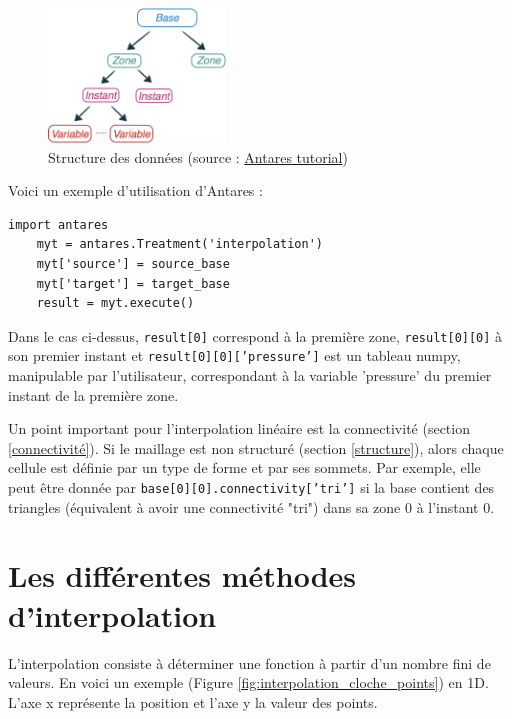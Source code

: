 \begin{figure}[H]
\centering
\includegraphics[width=0.42\textwidth]{images/data_structure_1.png}
\caption{Structure des données (source : \href{https://cerfacs.fr/antares/src/tutorial/base.html}{Antares tutorial})}
\label{fig:structure_antares}
\end{figure}

Voici un exemple d'utilisation d'Antares :

\begin{lstlisting}[caption=Exemple simple d'utilisation d'Antares (traitement d'interpolation), label={lst:antares_2}]
    import antares
    myt = antares.Treatment('interpolation')
    myt['source'] = source_base
    myt['target'] = target_base
    result = myt.execute()
\end{lstlisting}

Dans le cas ci-dessus, \texttt{result[0]} correspond à la première zone, \texttt{result[0][0]} à son premier instant et \texttt{result[0][0]['pressure']} est un tableau numpy, manipulable par l'utilisateur, correspondant à la variable 'pressure' du premier instant de la première zone.

Un point important pour l'interpolation linéaire est la connectivité (section \ref{connectivité}). Si le maillage est non structuré (section \ref{structure}), alors chaque cellule est définie par un type de forme et par ses sommets. Par exemple, elle peut être donnée par \texttt{base[0][0].connectivity['tri']} si la base contient des triangles (équivalent à avoir une connectivité "tri") dans sa zone 0 à l'instant 0.


\newpage
\section{Les différentes méthodes d'interpolation}

L'interpolation consiste à déterminer une fonction à partir d'un nombre fini de valeurs. En voici un exemple (Figure \ref{fig:interpolation_cloche_points}) en \ac{1D}. L'axe x représente la position et l'axe y la valeur des points.

